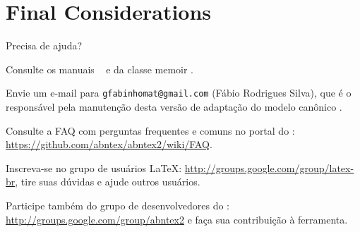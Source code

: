 \chapter{Final Considerations}

Precisa de ajuda?

Consulte os manuais \abnTeX\ \cite{abntex2classe,abntex2cite,abntex2cite-alf} e da classe \textsf{memoir} \cite{memoir}.

Envie um e-mail para \texttt{gfabinhomat@gmail.com} (Fábio Rodrigues Silva), que é o responsável pela manutenção desta versão de adaptação do modelo canônico \abnTeX.

Consulte a FAQ com perguntas frequentes e comuns no portal do \abnTeX:
\url{https://github.com/abntex/abntex2/wiki/FAQ}.

Inscreva-se no grupo de usuários \LaTeX: \url{http://groups.google.com/group/latex-br}, tire suas dúvidas e ajude outros usuários.

Participe também do grupo de desenvolvedores do \abnTeX: \url{http://groups.google.com/group/abntex2} e faça sua contribuição à ferramenta.
